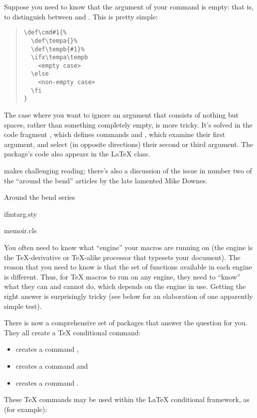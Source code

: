 
Suppose you need to know that the argument of your command is empty:
that is, to distinguish between  %
and .  This is pretty simple:
\begin{quote}
\begin{verbatim}
\def\cmd#1{%
  \def\tempa{}%
  \def\tempb{#1}%
  \ifx\tempa\tempb
    <empty case>
  \else
    <non-empty case>
  \fi
}
\end{verbatim}
\end{quote}
The case where you want to ignore an argument that consists of nothing
but spaces, rather than something completely empty, is more tricky.
It's solved in the code fragment , which defines
commands  and , which examine their
first argument, and select (in opposite directions) their second or
third argument.  The package's code also appears in the \LaTeX{}
 class.

 makes challenging reading; there's also a discussion of the
issue in number two of the ``around the bend'' articles by the late
lamented Mike Downes.
\begin{ctanrefs}
\item[\nothtml{\rmfamily}Around the bend series]
\item[ifmtarg.sty]
\item[memoir.cls]
\end{ctanrefs}


You often need to know what ``engine'' your macros are running on (the
engine is the \TeX{}-derivative or \TeX{}-alike processor that
typesets your document).  The reason that you need to know is that the
set of functions available in each engine is different.  Thus, for
\TeX{} macros to run on any engine, they need to ``know'' what they
can and cannot do, which depends on the engine in use.  Getting the
right answer is surprisingly tricky (see below for an elaboration of
one apparently simple test).

There is now a comprehensive set of packages that answer the question
for you.  They all create a \TeX{} conditional command:
\begin{itemize}
\item {} creates a command ,
\item {} creates a command  and
\item {} creates a command .
\end{itemize}
These \TeX{} commands may be used within the \LaTeX{} conditional
framework, as (for example):
\begin{quote}
  \texttt{\obracesymbol{}}\texttt{\cbracesymbol{}}\texttt{\obracesymbol{}}\texttt{\cbracesymbol{}}\texttt{\obracesymbol{}}\texttt{\cbracesymbol{}}
\end{quote}


